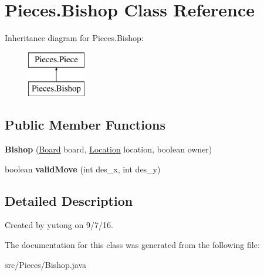 \hypertarget{classMain_1_1Bishop}{\section{Pieces.\-Bishop Class Reference}
\label{classMain_1_1Bishop}
}
Inheritance diagram for Pieces.\-Bishop\-:\begin{figure}[H]
\begin{center}
\leavevmode
\includegraphics[height=2.000000cm]{classMain_1_1Bishop}
\end{center}
\end{figure}
\subsection*{Public Member Functions}
\begin{DoxyCompactItemize}
\item 
\hypertarget{classMain_1_1Bishop_a27af6f9a91e405192c5571b8f9693818}{{\bfseries Bishop} (\hyperlink{classMain_1_1Board}{Board} board, \hyperlink{classMain_1_1Location}{Location} location, boolean owner)}\label{classMain_1_1Bishop_a27af6f9a91e405192c5571b8f9693818}

\item 
\hypertarget{classMain_1_1Bishop_a94adde7d6d6e345adf9b074c0177e079}{boolean {\bfseries valid\-Move} (int des\-\_\-x, int des\-\_\-y)}\label{classMain_1_1Bishop_a94adde7d6d6e345adf9b074c0177e079}

\end{DoxyCompactItemize}


\subsection{Detailed Description}
Created by yutong on 9/7/16. 

The documentation for this class was generated from the following file\-:\begin{DoxyCompactItemize}
\item 
src/\-Pieces/Bishop.\-java\end{DoxyCompactItemize}
